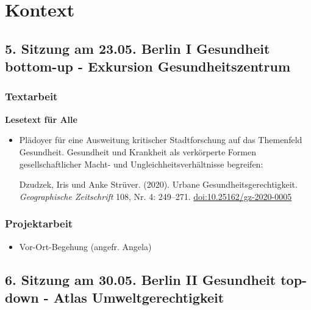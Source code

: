 \documentclass[
  ngerman,
]{article}
\providecommand{\tightlist}{%
  \setlength{\itemsep}{0pt}\setlength{\parskip}{0pt}}
\begin{document}
\hypertarget{kontext}{%
\section*{Kontext}\label{kontext}}

\hypertarget{sitzung-am-23.05.-berlin-i-gesundheit-bottom-up---exkursion-gesundheitszentrum}{%
\subsection*{5. Sitzung am 23.05. \textbar{} Berlin I Gesundheit bottom-up - Exkursion Gesundheitszentrum}\label{sitzung-am-23.05.-berlin-i-gesundheit-bottom-up---exkursion-gesundheitszentrum}}

\hypertarget{textarbeit-4}{%
\subsubsection*{Textarbeit}\label{textarbeit-4}}

\textbf{Lesetext für Alle}

\begin{itemize}
\item
  Plädoyer für eine Ausweitung kritischer Stadtforschung auf das Themenfeld Gesundheit. Gesundheit und Krankheit als verkörperte Formen gesellschaftlicher Macht- und Ungleichheitsverhältnisse begreifen:

  Dzudzek, Iris und Anke Strüver. (2020). Urbane Gesundheitsgerechtigkeit. \emph{Geographische Zeitschrift} 108, Nr. 4: 249--271. \url{doi:10.25162/gz-2020-0005}
\end{itemize}

\hypertarget{projektarbeit-3}{%
\subsubsection*{Projektarbeit}\label{projektarbeit-3}}

\begin{itemize}
\tightlist
\item
  Vor-Ort-Begehung (angefr. Angela)
\end{itemize}

\hypertarget{sitzung-am-30.05.-berlin-ii-gesundheit-top-down---atlas-umweltgerechtigkeit}{%
\subsection*{6. Sitzung am 30.05. \textbar{} Berlin II Gesundheit top-down - Atlas Umweltgerechtigkeit}\label{sitzung-am-30.05.-berlin-ii-gesundheit-top-down---atlas-umweltgerechtigkeit}}
\end{document}
